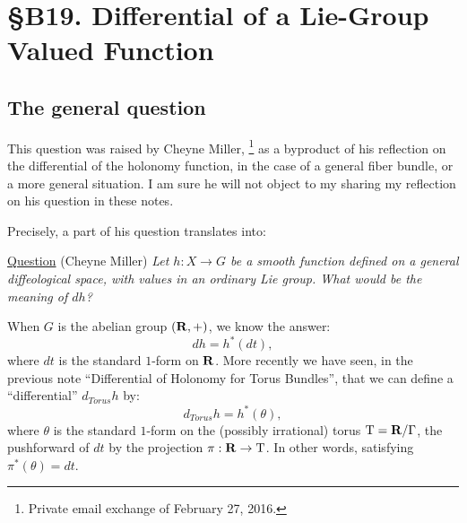 
\chapter*{\S B19. Differential of a Lie-Group Valued Function}
\setcounter{footnote}{0}


\begin{abstract}
  In this note we give a meaning to the differential of a smooth function defined on a diffeological space,
  with values in a Lie group.
\end{abstract}


\section{The general question}

This question was raised by Cheyne Miller,%
\footnote{Private email exchange of February 27, 2016.}
as a byproduct of his reflection on the differential of the holonomy function,
in the case of a general fiber bundle, or a more general situation.
I am sure he will not object to my sharing my reflection on his question in these notes.

Precisely,
a part of his question translates into:

\uline{Question} (Cheyne Miller) {\itshape Let $h : X \to G$ be a smooth function defined on a general diffeological space,
with values in an ordinary Lie group. What would be the meaning of $dh$?}

When $G$ is the abelian group $(\mathbf{R},+)$, we know the answer:
$$
  dh = h^*(dt),
$$
where $dt$ is the standard $1$-form on $\mathbf{R}$.
More recently we have seen,
in the previous note ``Differential of Holonomy for Torus Bundles'',
that we can define a ``differential'' $d_{Torus} h$ by:
$$
  d_{Torus} h = h^*(\theta),
$$
where $\theta$ is the standard $1$-form on the (possibly irrational) torus $\mathrm{T} = \mathbf{R}/\Gamma$,
the pushforward of $dt$ by the projection $\pi : \mathbf{R} \to \mathrm{T}$.
In other words,
satisfying $\pi^*(\theta) = dt$.

